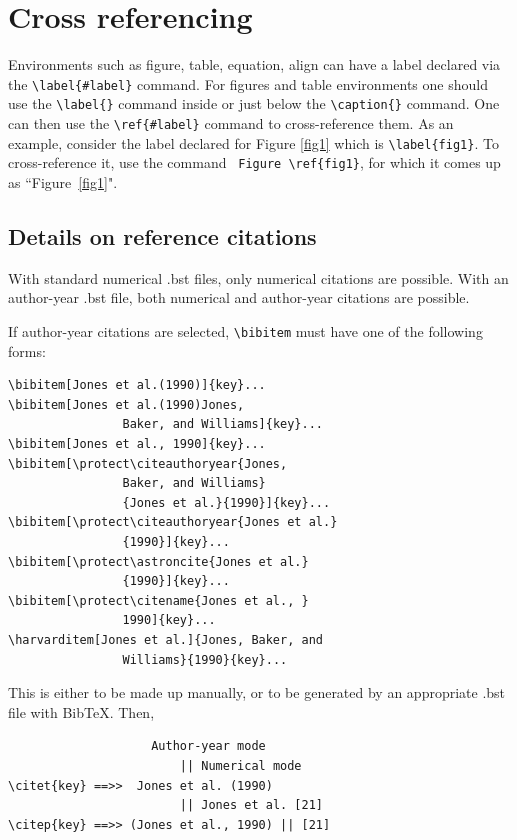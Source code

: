 \documentclass[numbers,webpdf]{ima-authoring-template}%
\theoremstyle{thmstyletwo}%
\numberwithin{equation}{section}
\begin{document}
\section{Cross referencing}\label{sec8}

Environments such as figure, table, equation, align can have a label
declared via the \verb+\label{#label}+ command. For figures and table
environments one should use the \verb+\label{}+ command inside or just
below the \verb+\caption{}+ command.  One can then use the
\verb+\ref{#label}+ command to cross-reference them. As an example, consider
the label declared for Figure \ref{fig1} which is
\verb+\label{fig1}+. To cross-reference it, use the command
\verb+ Figure \ref{fig1}+, for which it comes up as
``Figure~\ref{fig1}".

\subsection{Details on reference citations}\label{subsec3}

With standard numerical .bst files, only numerical citations are possible.
With an author-year .bst file, both numerical and author-year citations are possible.

If author-year citations are selected, \verb+\bibitem+ must have one of the following forms:


{\footnotesize%
\begin{verbatim}
\bibitem[Jones et al.(1990)]{key}...
\bibitem[Jones et al.(1990)Jones,
                Baker, and Williams]{key}...
\bibitem[Jones et al., 1990]{key}...
\bibitem[\protect\citeauthoryear{Jones,
                Baker, and Williams}
                {Jones et al.}{1990}]{key}...
\bibitem[\protect\citeauthoryear{Jones et al.}
                {1990}]{key}...
\bibitem[\protect\astroncite{Jones et al.}
                {1990}]{key}...
\bibitem[\protect\citename{Jones et al., }
                1990]{key}...
\harvarditem[Jones et al.]{Jones, Baker, and
                Williams}{1990}{key}...
\end{verbatim}}


This is either to be made up manually, or to be generated by an
appropriate .bst file with BibTeX. Then,


{%
\begin{verbatim}
                    Author-year mode
                        || Numerical mode
\citet{key} ==>>  Jones et al. (1990)
                        || Jones et al. [21]
\citep{key} ==>> (Jones et al., 1990) || [21]
\end{verbatim}}
\end{document}
